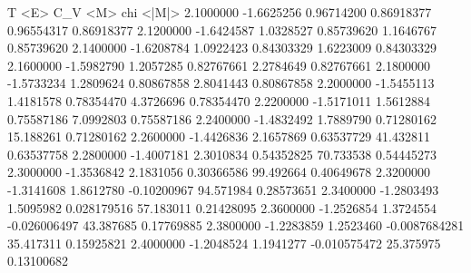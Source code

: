           T             <E>           C_V          <M>              chi            <|M|>  
      2.1000000     -1.6625256     0.96714200     0.86918377     0.96554317     0.86918377
      2.1200000     -1.6424587      1.0328527     0.85739620      1.1646767     0.85739620
      2.1400000     -1.6208784      1.0922423     0.84303329      1.6223009     0.84303329
      2.1600000     -1.5982790      1.2057285     0.82767661      2.2784649     0.82767661
      2.1800000     -1.5733234      1.2809624     0.80867858      2.8041443     0.80867858
      2.2000000     -1.5455113      1.4181578     0.78354470      4.3726696     0.78354470
      2.2200000     -1.5171011      1.5612884     0.75587186      7.0992803     0.75587186
      2.2400000     -1.4832492      1.7889790     0.71280162      15.188261     0.71280162
      2.2600000     -1.4426836      2.1657869     0.63537729      41.432811     0.63537758
      2.2800000     -1.4007181      2.3010834     0.54352825      70.733538     0.54445273
      2.3000000     -1.3536842      2.1831056     0.30366586      99.492664     0.40649678
      2.3200000     -1.3141608      1.8612780    -0.10200967      94.571984     0.28573651
      2.3400000     -1.2803493      1.5095982    0.028179516      57.183011     0.21428095
      2.3600000     -1.2526854      1.3724554   -0.026006497      43.387685     0.17769885
      2.3800000     -1.2283859      1.2523460  -0.0087684281      35.417311     0.15925821
      2.4000000     -1.2048524      1.1941277   -0.010575472      25.375975     0.13100682
